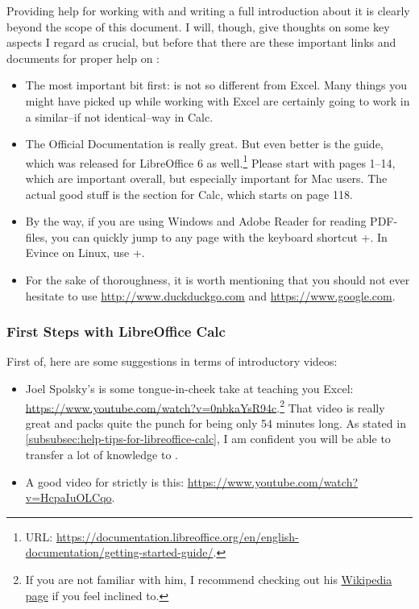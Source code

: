 Providing help for working with \loc and writing a full introduction about it is clearly beyond the scope of this document.
I will, though, give thoughts on some key aspects I regard as crucial, but before that there are these important links and documents for proper help on \loc:
\begin{itemize}
	\item The most important bit first: \loc is not so different from Excel.
	Many things you might have picked up while working with Excel are certainly going to work in a similar--if not identical--way in Calc.
	\item The Official Documentation is really great.
	But even better is the  guide, which was released for LibreOffice 6 as well.\footnote{URL: \href{https://documentation.libreoffice.org/en/english-documentation/getting-started-guide/}{https://documentation.libreoffice.org/en/english-documentation/getting-started-guide/}.}
	Please start with pages 1--14, which are important overall, but especially important for Mac users.
	The actual good stuff is the section for Calc, which starts on page 118.
	\item By the way, if you are using Windows and Adobe Reader for reading PDF-files, you can quickly jump to any page with the keyboard shortcut +.
	In Evince on Linux, use +.
	\item For the sake of thoroughness, it is worth mentioning that you should  not ever hesitate to use \href{http://www.duckduckgo.com}{http://www.duckduckgo.com} and  \href{https://www.google.com}{https://www.google.com}.
\end{itemize}

\subsubsection{First Steps with LibreOffice Calc}
\label{subsubsec:first-steps-with-libreoffice-calc}

First of, here are some suggestions in terms of introductory videos:
\begin{itemize}
	\item Joel Spolsky's  is some tongue-in-cheek take at teaching you Excel: \url{https://www.youtube.com/watch?v=0nbkaYsR94c}.\footnote{If you are not familiar with him, I recommend checking out his \href{https://en.wikipedia.org/wiki/Joel_Spolsky}{Wikipedia page} if you feel inclined to.}
	That video is really great and packs quite the punch for being only 54 minutes long.
	As stated in \autoref{subsubsec:help-tips-for-libreoffice-calc}, I am confident you will be able to transfer a lot of knowledge to \loc.
	\item A good video for strictly \loc is this: \url{https://www.youtube.com/watch?v=HcpaIuOLCqo}.
\end{itemize}

